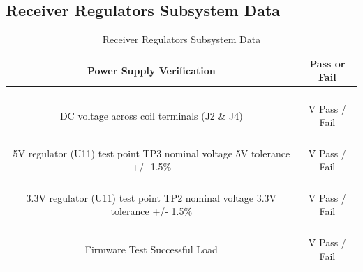 \documentclass[12pt]{article}
\begin{document}
\begin{appendices}
\subsection{Receiver Regulators Subsystem Data}

\begin{table}[h!]
\centering
\caption*{Receiver Regulators Subsystem Data}
\begin{tabular}{ | c | c | }
\hline
\textbf{Power Supply Verification} & \textbf{Pass or Fail} \\
\hline
\parbox{0.5\linewidth}{\raggedright \hfill \\[-0.25 em]
DC voltage across coil terminals (J2 \& J4)
 \hfill \\[0.1 em]} &  \parbox{0.4\linewidth}{\raggedright \hfill \\ [0.7 em]
\underline{\hspace{0.625in}} V  \hspace{0.125 in}Pass \space / \space  Fail \hfill \\ [0.3 em]
} \\
\hline
\parbox{0.5\linewidth}{\raggedright \hfill \\[-0.25 em]
5V regulator (U11) test point TP3 nominal voltage 5V  tolerance +/- 1.5\%
\hfill \\[0.1 em]} &  \parbox{0.4\linewidth}{\raggedright \hfill \\ [0.7 em]
\underline{\hspace{0.625in}} V  \hspace{0.125 in}Pass \space / \space  Fail \hfill \\ [0.3 em]
} \\
\hline
\parbox{0.5\linewidth}{\raggedright \hfill \\[-0.25 em]
3.3V regulator (U11) test point TP2 nominal voltage 3.3V  tolerance +/- 1.5\%
\hfill \\[0.1 em]} &  \parbox{0.4\linewidth}{\raggedright \hfill \\ [0.7 em]
\underline{\hspace{0.625in}} V  \hspace{0.125 in}Pass \space / \space  Fail \hfill \\ [0.3 em]
} \\ 
\hline
\parbox{0.5\linewidth}{\raggedright \hfill \\[-0.25 em]
Firmware Test Successful Load
\hfill \\[0.1 em]} &  \parbox{0.4\linewidth}{\raggedright \hfill \\ [0.7 em]
\underline{\hspace{0.625in}} V  \hspace{0.125 in}Pass \space / \space  Fail \hfill \\ [0.3 em]
} \\ 
\hline
\end{tabular}
\end{table}
\hfill \\
\pagebreak


\end{appendices}
\end{document}
